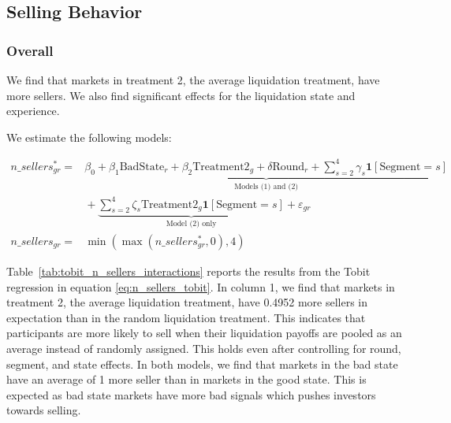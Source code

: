 \documentclass[11pt]{article}
\begin{document}
\begin{table}[H]
  \centering
  \caption{Group-round counts, seller counts, and selling timing by treatment and chat condition}
  \label{tab:summary_seller_counts}
  
\end{table}


\vspace{1in}



\subsection{Selling Behavior}



\subsubsection{Overall}



We find that markets in treatment 2, the average liquidation treatment, have more sellers. We also find significant effects for the liquidation state and experience.

We estimate the following models:

\begin{equation}
\begin{split}
n\_sellers^{*}_{gr} ={}& \underbrace{\beta_0 + \beta_1 \text{BadState}_{r} + \beta_2 \text{Treatment2}_{g} + \delta \text{Round}_{r} + \sum_{s=2}^{4} \gamma_s \mathbf{1}[\text{Segment}=s]}_{\text{Models (1) and (2)}} \\
&{} + \underbrace{\sum_{s=2}^{4} \zeta_s \text{Treatment2}_{g} \mathbf{1}[\text{Segment}=s]}_{\text{Model (2) only}} + \varepsilon_{gr} \\
n\_sellers_{gr} ={}& \min(\max(n\_sellers^{*}_{gr},0),4)
\end{split}
\label{eq:n_sellers_tobit}
\end{equation}


Table~\ref{tab:tobit_n_sellers_interactions} reports the results from the Tobit regression in equation \ref{eq:n_sellers_tobit}.
In column 1, we find that markets in treatment 2, the average liquidation treatment, have 0.4952 more sellers in expectation than in the random liquidation treatment.
This indicates that participants are more likely to sell when their liquidation payoffs are pooled as an average instead of randomly assigned. This holds even after controlling for round, segment, and state effects.
In both models, we find that markets in the bad state have an average of 1 more seller than in markets in the good state. This is expected as 
bad state markets have more bad signals which pushes investors towards selling. 
\end{document}
